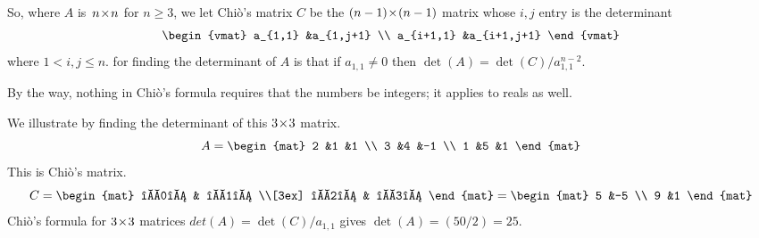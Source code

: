 So, where $A$ is~$n \! \times \! n$ for $n\geq 3$, we let Chi\`o's matrix $C$ be the
$(n-1) \! \times \! (n-1)$ matrix whose $i,j$ entry is the determinant
\begin{equation*}
  \begin{vmat}
    a_{1,1}  &a_{1,j+1} \\
    a_{i+1,1}    &a_{i+1,j+1}
  \end{vmat}
\end{equation*}
where $1<i,j\leq n$.
for finding the determinant of $A$ is that
if $a_{1,1}\neq 0$ then
$\det(A)=\det(C)/a_{1,1}^{n-2}$.

By the way,
nothing in Chi\`o's formula requires that the numbers be integers; it applies
to reals as well. 

We illustrate by finding the determinant of this $3 \! \times \! 3$ matrix.
\begin{equation*} 
  A=
  \begin{mat}
    2 &1 &1 \\
    3 &4 &-1 \\
    1 &5 &1 
  \end{mat}
\end{equation*}
This is Chi\`o's matrix.
\begin{equation*}
  C=
  \begin{mat}
    \begin{vmat}
      2 &1 \\
      3 &4
    \end{vmat}
   &
   \begin{vmat}
     2 &1 \\
     3 &-1
   \end{vmat}        \\[3ex]      
   \begin{vmat}
     2 &1 \\
     1 &5
   \end{vmat}
   &
   \begin{vmat}
     2 &1 \\
     1 &1
   \end{vmat}
  \end{mat}
  =
  \begin{mat}
    5  &-5  \\
    9  &1
  \end{mat}
\end{equation*}
Chi\`o's formula for $3 \! \times \! 3$ matrices
$det(A)=\det(C)/a_{1,1}$ gives $\det(A)=(50/2)=25$.

